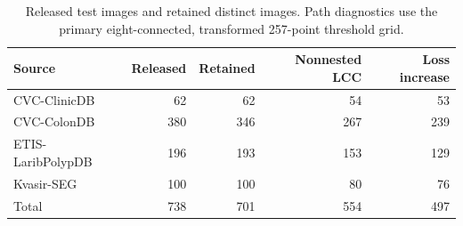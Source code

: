 \begin{table}[htbp]
\centering\small
\caption{Released test images and retained distinct images. Path diagnostics use the primary eight-connected, transformed 257-point threshold grid.}
\label{tab:data}
\begin{tabular}{lrrrr}\toprule
Source & Released & Retained & Nonnested LCC & Loss increase\\\midrule
CVC-ClinicDB & 62 & 62 & 54 & 53 \\
CVC-ColonDB & 380 & 346 & 267 & 239 \\
ETIS-LaribPolypDB & 196 & 193 & 153 & 129 \\
Kvasir-SEG & 100 & 100 & 80 & 76 \\
\midrule Total & 738 & 701 & 554 & 497 \\
\bottomrule\end{tabular}\end{table}